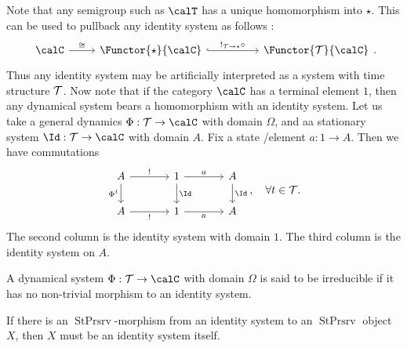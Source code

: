 \documentclass[12pt,oneside,pb-diagram]{article}
\DeclareMathOperator{\sps}{StPrsrv}
\begin{document}
Note that any semigroup such as $\calT$ has a unique homomorphism into $\star$. This can be used to pullback any identity system as follows :
%
\[\begin{tikzcd}
	\calC \arrow[r, "\cong"] & \Functor{\star}{\calC} \arrow[rr, "!_{\Time\to\star} \circ", hook] && \Functor{\Time}{\calC}
\end{tikzcd} .\]
%
Thus any identity system may be artificially interpreted as a system with time structure $\mathcal{T}$. Now note that if the category $\calC$ has a terminal element $1$, then any dynamical system bears a homomorphism with an identity system. Let us take a general dynamics $\Phi:\Time\to\calC$ with domain $\Omega$, and aa stationary system $\Id : \Time\to \calC$ with domain $A$. Fix a state /element $a:1\to A$. Then we have commutations
%
\[\begin{tikzcd} [column sep = large]
	A \arrow[r, "!"] \arrow[d, "\Phi^t"'] & 1 \arrow[d, "\Id"] \arrow[r, "a"] & A \arrow[d, "\Id"] \\
	A \arrow[r, "!"'] & 1 \arrow[r, "a"'] & A 
\end{tikzcd} , \quad \forall t\in \Time.\]
%
The second column is the identity system with domain $1$. The third column is the identity system on $A$. 

\begin{definition} 
	A dynamical system $\Phi:\Time\to\calC$ with domain $\Omega$ is said to be irreducible if it has no non-trivial morphism to an identity system.
\end{definition}

\begin{lemma} \label{lem:d90did}
	If there is an $\sps$-morphism from an identity system to an $\sps$ object $X$, then $X$ must be an identity system itself.
\end{lemma}
\end{document}

